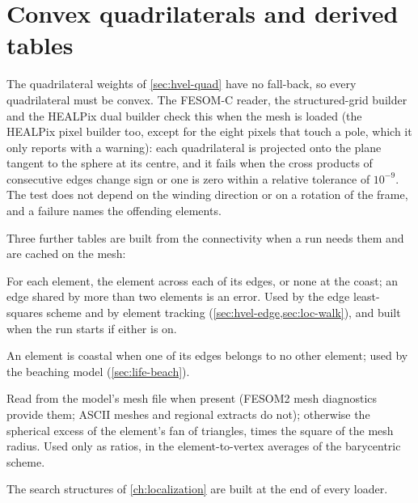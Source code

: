 

\section{Convex quadrilaterals and derived tables}\label{sec:mesh-derived}

The quadrilateral weights of \cref{sec:hvel-quad} have no fall-back, so every quadrilateral must be convex.
The FESOM-C reader, the structured-grid builder and the HEALPix dual builder check this when the mesh is
loaded (the HEALPix pixel builder too, except for the eight pixels that touch a pole, which it only reports
with a warning): each quadrilateral is projected onto the plane tangent to the sphere at its centre, and it fails
when the cross products of consecutive edges change sign or one is zero within a relative tolerance of
$10^{-9}$. The test does not depend on the winding direction or on a rotation of the frame, and a failure
names the offending elements.

Three further tables are built from the connectivity when a run needs them and are cached on the mesh:
\begin{description}[font=\normalfont\itshape,style=nextline,leftmargin=1.5em]
  \item[Element neighbours.] For each element, the element across each of its edges, or none at the coast;
    an edge shared by more than two elements is an error. Used by the edge least-squares scheme and by
    element tracking (\cref{sec:hvel-edge,sec:loc-walk}), and built when the run starts if either is on.
  \item[Coastal flags.] An element is coastal when one of its edges belongs to no other element; used by
    the beaching model (\cref{sec:life-beach}).
  \item[Element areas.] Read from the model's mesh file when present (FESOM2 mesh diagnostics provide them;
    ASCII meshes and regional extracts do not);
    otherwise the spherical excess of the element's fan of triangles, times the square of the mesh radius.
    Used only as ratios, in the element-to-vertex averages of the barycentric scheme.
\end{description}
The search structures of \cref{ch:localization} are built at the end of every loader.

